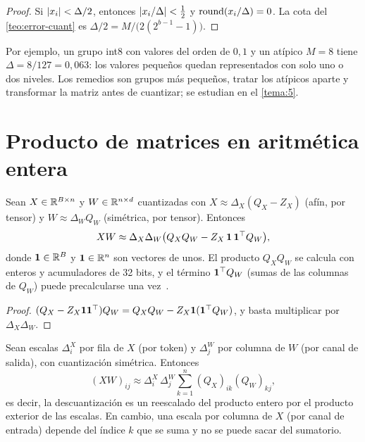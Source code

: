 \begin{proof}
Si $\lvert x_i\rvert<\Delta/2$, entonces $\lvert x_i/\Delta\rvert<\frac12$ y $\operatorname{round}(x_i/\Delta)=0$. La cota del \cref{teo:error-cuant} es $\Delta/2=M/\bigl(2(2^{b-1}-1)\bigr)$.
\end{proof}

Por ejemplo, un grupo int8 con valores del orden de $0{,}1$ y un atípico $M=8$ tiene $\Delta=8/127=0{,}063$: los valores pequeños quedan representados con solo uno o dos niveles. Los remedios son grupos más pequeños, tratar los atípicos aparte y transformar la matriz antes de cuantizar; se estudian en el \cref{tema:5}.

\section{Producto de matrices en aritmética entera}

\begin{proposicion}\label{prop:producto-entero}
Sean $X\in\mathbb{R}^{B\times n}$ y $W\in\mathbb{R}^{n\times d}$ cuantizadas con $X\approx\Delta_X(Q_X-Z_X)$ (afín, por tensor) y $W\approx\Delta_WQ_W$ (simétrica, por tensor). Entonces
\[
XW\approx\Delta_X\Delta_W\bigl(Q_XQ_W-Z_X\,\mathbf{1}\,\mathbf{1}^{\top} Q_W\bigr),
\]
donde $\mathbf{1}\in\mathbb{R}^{B}$ y $\mathbf{1}\in\mathbb{R}^{n}$ son vectores de unos. El producto $Q_XQ_W$ se calcula con enteros y acumuladores de 32 bits, y el término $\mathbf{1}^{\top} Q_W$ (sumas de las columnas de $Q_W$) puede precalcularse una vez~\cite[§2]{jacob}.
\end{proposicion}

\begin{proof}
$(Q_X-Z_X\mathbf{1}\mathbf{1}^{\top})Q_W=Q_XQ_W-Z_X\mathbf{1}(\mathbf{1}^{\top} Q_W)$, y basta multiplicar por $\Delta_X\Delta_W$.
\end{proof}

\begin{proposicion}\label{prop:factorizar}
Sean escalas $\Delta^{X}_{i}$ por fila de $X$ (por token) y $\Delta^{W}_{j}$ por columna de $W$ (por canal de salida), con cuantización simétrica. Entonces
\[
(XW)_{ij}\approx\Delta^{X}_{i}\,\Delta^{W}_{j}\sum_{k=1}^{n}(Q_X)_{ik}(Q_W)_{kj},
\]
es decir, la descuantización es un reescalado del producto entero por el producto exterior de las escalas. En cambio, una escala por columna de $X$ (por canal de entrada) depende del índice $k$ que se suma y no se puede sacar del sumatorio.
\end{proposicion}

